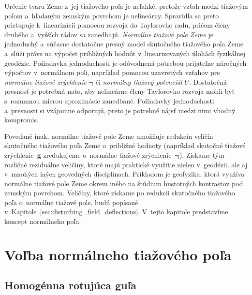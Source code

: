 \documentclass[a4paper, 12pt]{book}
\let\vec\mathbf
\begin{document}
Určenie tvaru Zeme z~jej tiažového poľa je neľahké, pretože vzťah medzi 
tiažovým poľom a~hľadaným zemským povrchom je nelineárny.  Spravidla sa preto 
pristupuje k~linearizácii pomocou rozvoja do Taylorovho radu, pričom členy 
druhého a~vyšších rádov sa zanedbajú.  \emph{Normálne tiažové pole Zeme} je 
jednoduchý a~súčasne dostatočne presný model skutočného tiažového poľa Zeme 
a~slúži práve na výpočet približných hodnôt v~linearizovaných úlohách 
fyzikálnej geodézie.  Požiadavka jednoduchosti je odôvodnená potrebou 
prijateľne náročných výpočtov v~normálnom poli, napríklad pomocou uzavretých 
vzťahov pre \emph{normálne tiažové zrýchlenie} $\boldsymbol{\gamma}$ či 
\emph{normálny tiažový potenciál} $U$.  Dostatočná presnosť je potrebná nato, 
aby nelineárne členy Taylorovho rozvoja mohli byť s~rozumnou mierou aproximácie 
zanedbané.  Požiadavky jednoduchosti a~presnosti si vzájomne odporujú, preto je 
potrebné nájsť medzi nimi vhodný kompromis.

Povedané inak, normálne tiažové pole Zeme umožňuje redukciu veličín skutočného 
tiažového poľa Zeme o~približné hodnoty (napríklad skutočné tiažové 
zrýchlenie~$\vec g$ zredukujeme o~normálne tiažové 
zrýchlenie~$\boldsymbol{\gamma}$).  Získame tým rozličné reziduálne veličiny, 
ktoré majú praktické využitie nielen v~geodézii, ale aj v~mnohých iných 
geovedných disciplínach.  Príkladom je geofyzika, ktorá využíva normálne 
tiažové pole Zeme okrem iného na štúdium hustotných kontrastov pod zemským 
povrchom.  Veličiny, ktoré získame po redukcii skutočného tiažového poľa 
o~normálne tiažové pole, budú popísané 
v~Kapitole~\ref{sec:disturbing_field_deflections}.  V~tejto kapitole 
predstavíme koncept normálneho poľa.

\section{Voľba normálneho tiažového poľa}
\label{sec:choice_of_normal_gravity_field}

\subsection{Homogénna rotujúca guľa}
\label{sec:normal_field_ball}
\end{document}
